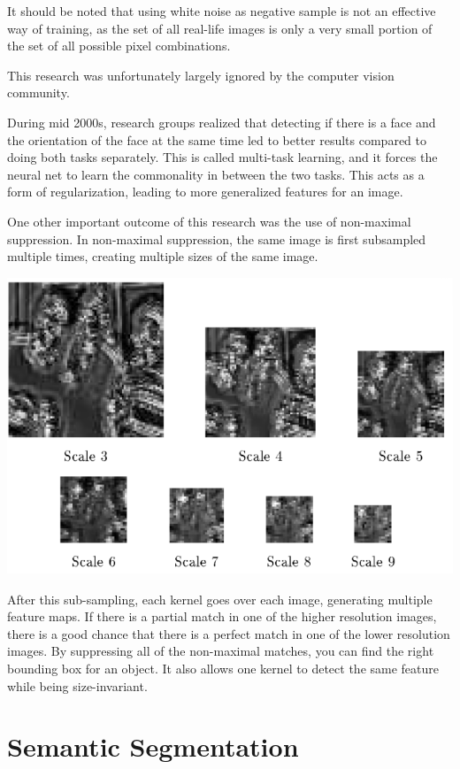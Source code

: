 It should be noted that using white noise as negative sample is not an effective way of training, as the set of all real-life images is only a very small portion of the set of all possible pixel combinations.

This research was unfortunately largely ignored by the computer vision community.

During mid 2000s, research groups realized that detecting if there is a face and the orientation of the face at the same time led to better results compared to doing both tasks separately.
This is called multi-task learning, and it forces the neural net to learn the commonality in between the two tasks.
This acts as a form of regularization, leading to more generalized features for an image.

One other important outcome of this research was the use of non-maximal suppression.
In non-maximal suppression, the same image is first subsampled multiple times, creating multiple sizes of the same image.

\begin{center}
	\includegraphics[width=0.5\linewidth]{lectures/04-a/images/non-max-supp.png}
	\label{fig:NonMaxSupp}
\end{center}

After this sub-sampling, each kernel goes over each image, generating multiple feature maps.
If there is a partial match in one of the higher resolution images, there is a good chance that there is a perfect match in one of the lower resolution images.
By suppressing all of the non-maximal matches, you can find the right bounding box for an object.
It also allows one kernel to detect the same feature while being size-invariant.



\section{Semantic Segmentation}

